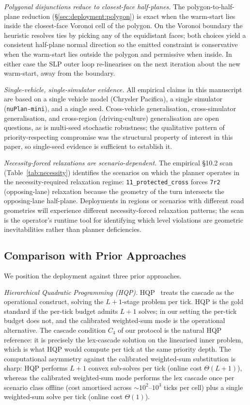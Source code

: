 \emph{Polygonal disjunctions reduce to closest-face half-planes.} The polygon-to-half-plane reduction (\S\ref{sec:deployment:polygon}) is exact when the warm-start lies inside the closest-face Voronoi cell of the polygon. On the Voronoi boundary the heuristic resolves ties by picking any of the equidistant faces; both choices yield a consistent half-plane normal direction so the emitted constraint is conservative when the warm-start lies outside the polygon and permissive when inside. In either case the SLP outer loop re-linearises on the next iteration about the new warm-start, away from the boundary.

\emph{Single-vehicle, single-simulator evidence.} All empirical claims in this manuscript are based on a single vehicle model (Chrysler Pacifica), a single simulator (\texttt{nuPlan-mini}), and a single seed. Cross-vehicle generalisation, cross-simulator generalisation, and cross-region (driving-culture) generalisation are open questions, as is multi-seed stochastic robustness; the qualitative pattern of priority-respecting compromise was the structural property of interest in this paper, so single-seed evidence is sufficient to establish it.

\emph{Necessity-forced relaxations are scenario-dependent.} The empirical \S10.2 scan (Table~\ref{tab:necessity}) identifies the scenarios on which the planner operates in the necessity-required relaxation regime: \texttt{11\_protected\_cross} forces \texttt{7r2} (opposing-lane) relaxation because the geometry of the turn intersects the opposing-lane half-plane. Deployments in regions or scenarios with different road geometries will experience different necessity-forced relaxation patterns; the scan is the operator's runtime tool for identifying which level violations are geometric inevitabilities rather than planner deficiencies.

\subsection{Comparison with Prior Approaches}
\label{sec:discussion:comparison}

We position the deployment against three prior approaches.

\emph{Hierarchical Quadratic Programming (HQP).} HQP~\cite{escande2014hqp,kanoun2011prioritized} treats the cascade as the operational construct, solving the $L+1$-stage problem per tick. HQP is the gold standard if the per-tick budget admits $L+1$ solves; in our setting the per-tick budget does not, and the calibrated weighted-sum mode is the operational alternative. The cascade condition $C_4$ of our protocol is the natural HQP reference: it is precisely the lex-cascade solution on the linearised inner problem, which is what HQP would compute per tick at the same priority depth. The computational asymmetry against the calibrated weighted-sum substitution is sharp: HQP performs $L+1$ convex sub-solves per tick (online cost $\Theta(L+1)$), whereas the calibrated weighted-sum mode performs the lex cascade once per scenario class offline (cost amortised across $\sim 10^2$--$10^3$ ticks per cell) plus a single weighted-sum solve per tick (online cost $\Theta(1)$).


